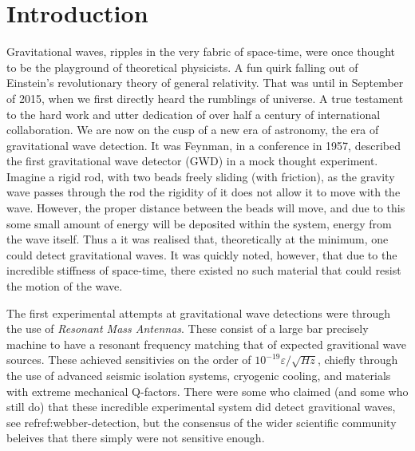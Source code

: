 \documentclass[aps,  
                a4paper, 
                amsmath, 
                amssymb, 
                preprint,
                tightenlines,  
                amsfonts,
                nofootinbib,
                onecolumn,
                titlepage,
                10pt
            ]{revtex4-2}
\begin{document}
\tableofcontents

\section{Introduction}
    \par
    Gravitational waves, ripples in the very fabric of space-time, were once thought to be the playground of theoretical physicists. A fun quirk falling out of Einstein's revolutionary theory of general relativity. That was until in September of 2015, when we first directly heard the rumblings of universe\cite{abbott2016}. A true testament to the hard work and utter dedication of over half a century of international collaboration. We are now on the cusp of a new era of astronomy, the era of gravitational wave detection. It was Feynman\cite{preskillnodate}, in a conference in 1957, described the first gravitational wave detector (GWD) in a mock thought experiment. Imagine a rigid rod, with two beads freely sliding (with friction), as the gravity wave passes through the rod the rigidity of it does not allow it to move with the wave. However, the proper distance between the beads will move, and due to this some small amount of energy will be deposited within the system, energy from the wave itself. Thus a it was realised that, theoretically at the minimum, one could detect gravitational waves. It was quickly noted, however, that due to the incredible stiffness of space-time, there existed no such material that could resist the motion of the wave.
    \par
    The first experimental attempts at gravitational wave detections were through the use of \textit{Resonant Mass Antennas}. These consist of a large bar precisely machine to have a resonant frequency matching that of expected gravitional wave sources. These achieved sensitivies on the order of $10^{-19}\varepsilon/\sqrt{Hz}$, chiefly through the use of advanced seismic isolation systems, cryogenic cooling, and materials with extreme mechanical Q-factors. There were some who claimed (and some who still do) that these incredible experimental system did detect gravitional waves, see ref{ref:webber-detection}, but the consensus of the wider scientific community beleives that there simply were not sensitive enough.
\end{document}
